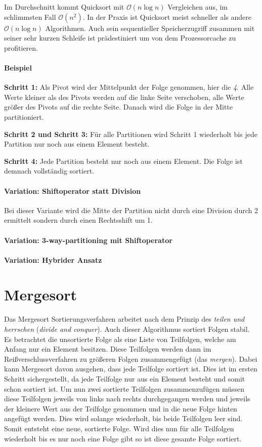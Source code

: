 \documentclass[12pt, a4paper, titlepage, hidelinks]{scrreprt}
\begin{document}
Im Durchschnitt kommt Quicksort mit $\mathcal{O}(n\log{}n)$ Vergleichen aus, im schlimmsten Fall $\mathcal{O}(n^2)$. In der Praxis ist Quicksort meist schneller als andere $\mathcal{O}(n\log{}n)$ Algorithmen. Auch sein sequentieller Speicherzugriff zusammen mit seiner sehr kurzen Schleife ist prädestiniert um von dem Prozessorcache zu profitieren.

\paragraph{Beispiel} 
\textbf{Schritt 1:} Als Pivot wird der Mittelpunkt der Folge genommen, hier die \textit{4}. Alle Werte kleiner als des Pivots werden auf die linke Seite verschoben, alle Werte größer des Pivots auf die rechte Seite. Danach wird die Folge in der Mitte partitioniert.

\textbf{Schritt 2 und Schritt 3:} Für alle Partitionen wird Schritt 1 wiederholt bis jede Partition nur noch aus einem Element besteht.

\textbf{Schritt 4:} Jede Partition besteht nur noch aus einem Element. Die Folge ist demnach vollständig sortiert.

\paragraph{Variation: Shiftoperator statt Division} Bei dieser Variante wird die Mitte der Partition nicht durch eine Division durch 2 ermittelt sondern durch einen Rechtsshift um 1.

\paragraph{Variation: 3-way-partitioning mit Shiftoperator}

\paragraph{Variation: Hybrider Ansatz}
\section{Mergesort}
Das Mergesort Sortierungsverfahren arbeitet nach dem Prinzip des \textit{teilen und herrschen} (\textit{divide and conquer}). Auch dieser Algorithmus sortiert Folgen stabil. Es betrachtet die unsortierte Folge als eine Liste von Teilfolgen, welche am Anfang nur ein Element besitzen. Diese Teilfolgen werden dann im Reißverschlussverfahren zu größeren Folgen zusammengefügt (das \textit{mergen}). Dabei kann Mergesort davon ausgehen, dass jede Teilfolge sortiert ist. Dies ist im ersten Schritt sichergestellt, da jede Teilfolge nur aus ein Element besteht und somit schon sortiert ist. Um nun zwei sortierte Teilfolgen zusammenzufügen müssen diese Teilfolgen jeweils von links nach rechts durchgegangen werden und jeweils der kleinere Wert aus der Teilfolge genommen und in die neue Folge hinten angefügt werden. Dies wird solange wiederholt, bis beide Teilfolgen leer sind. Somit entsteht eine neue, sortierte Folge. Wird dies nun für alle Teilfolgen wiederholt bis es nur noch eine Folge gibt so ist diese gesamte Folge sortiert.
\end{document}
